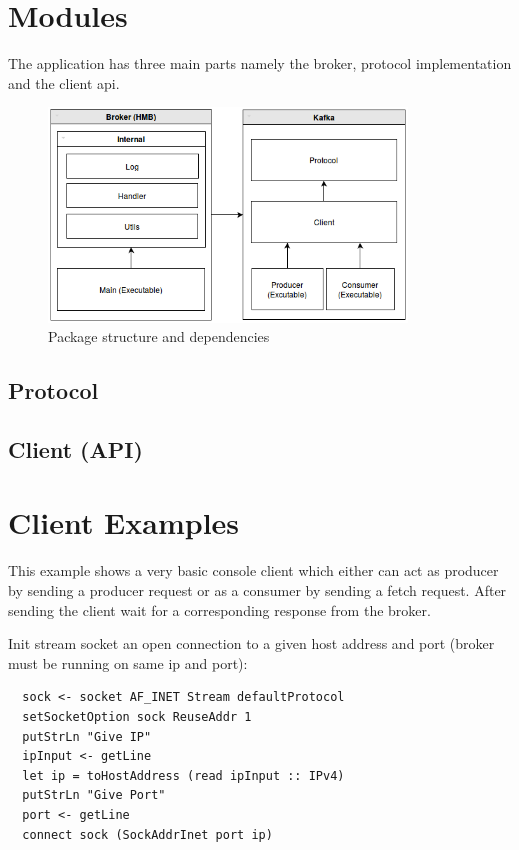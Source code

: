 \section{Modules}
The application has three main parts namely the broker, protocol implementation
and the client api. 

\begin{figure}[H]
    \centering
   \includegraphics[width=0.85\textwidth]{images/logical-architecture.png}
    \caption{Package structure and dependencies}
    \label{fig:logical-architecture}
\end{figure}

\subsection{Protocol}

\subsection{Client (API)}
 
\section{Client Examples}
This example shows a very basic console client which either can act as producer
by sending a producer request or as a consumer by sending a fetch request. After
sending the client wait for a corresponding response from the broker.

Init stream socket an open connection to a given host address and port (broker must be running on same ip and port): 
\begin{lstlisting}
  sock <- socket AF_INET Stream defaultProtocol 
  setSocketOption sock ReuseAddr 1
  putStrLn "Give IP"
  ipInput <- getLine
  let ip = toHostAddress (read ipInput :: IPv4)
  putStrLn "Give Port"
  port <- getLine
  connect sock (SockAddrInet port ip)
\end{lstlisting}

